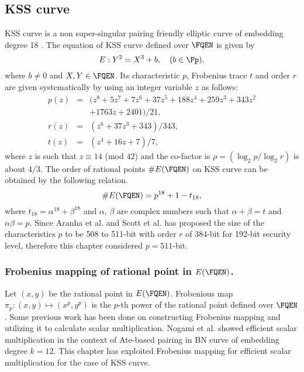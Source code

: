 \subsection{KSS curve}
KSS curve is a non super-singular pairing friendly elliptic curve of embedding degree 18 \cite{EPRINT:KacSchSco07}. The equation of KSS curve defined over $\FQEN$ is given by 
\begin{equation}\label{eq:KSS_curve}
E:Y^2=X^3+b, \quad \mbox{($b \in \Fp$)},
\end{equation}
where $b \neq 0$ and $X,Y \in \FQEN$. Its characteristic $p$, Frobenius trace $t$ and order $r$ are given systematically by using an integer variable $z$ as follows:
\begin{subequations}
\begin{eqnarray}
p(z) &= & (z^8 +5z^7 +7z^6 +37z^5 +188z^4 +259z^3 +343z^2  \nonumber \\ 								
& & +1763z+2401)/21,\\\label{eq:kss_char}
r(z) &= &(z^6 + 37z^3 + 343)/343,\label{eq:kss_degree}  \\
t(z) &=& (z^4 + 16z + 7)/7, \label{eq:kss_trace} 
\end{eqnarray}
\end{subequations} 
where $z$ is such that $z \equiv 14$ (mod $42$) and the co-factor is $\rho = (\log_2 p/\log_2 r)$ is about $4/3$.
The order of rational points $\#E(\FQEN)$ on KSS curve can be obtained by the following relation.
\begin{equation}\label{eq:order_relation}
\#E(\FQEN) = p^{18}+1-t_{18},
\end{equation}
where $t_{18} = \alpha^{18}+\beta^{18}$ and $\alpha$, $\beta$ are complex numbers such that $\alpha+\beta = t$ and $\alpha\beta=p$.
Since Aranha et al. \cite{PAIRING:AFKMR12} and Scott et al. \cite{IMA:Scott11} has proposed the size of the characteristics $p$ to be 508 to 511-bit with order $r$ of 384-bit  for 192-bit security level, therefore this chapter considered $p=511$-bit.

\subsubsection{Frobenius mapping of rational point in  $E(\FQEN)$.}
Let $(x,y)$ be the rational point in $E(\FQEN)$. 
Frobenious map $\pi_p : (x,y) \mapsto  (x^p,y^p)$ is the $p$-th power of the rational point defined over $\FQEN$. Some previous work \cite{fm_previous} has been done on constructing Frobenius mapping and utilizing it to calculate scalar multiplication. Nogami et al. \cite{DBLP:journals/ieicet/NogamiSONAM09} showed efficient scalar multiplication in the context of Ate-based pairing in BN curve of embedding degree $k=12$.  This chapter has exploited Frobenius mapping for efficient scalar multiplication for the case of KSS curve.

